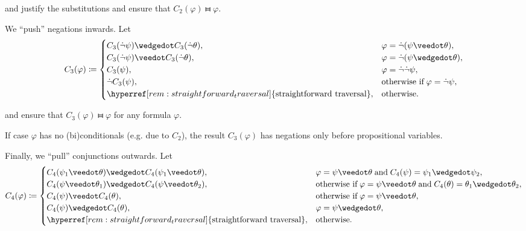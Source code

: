 \begin{algorithm}
\begin{thmenum}
     and  justify the substitutions and ensure that \( C_2(\varphi) \gleichstark \varphi \).

     We \enquote{push} negations inwards. Let
    \begin{equation*}
      C_3(\varphi) \coloneqq \begin{cases}
        C_3(\synneg \psi) \synwedge C_3(\synneg \theta),                         &\varphi = \synneg (\psi \synvee \theta), \\
        C_3(\synneg \psi) \synvee C_3(\synneg \theta),                           &\varphi = \synneg (\psi \synwedge \theta), \\
        C_3(\psi),                                                               &\varphi = \synneg \synneg \psi, \\
        \synneg C_3(\psi),                                                       &\T{otherwise if} \varphi = \synneg \psi, \\
        \hyperref[rem:straightforward_traversal]{\T{straightforward traversal}}, &\T{otherwise.}
      \end{cases}
    \end{equation*}

     and  ensure that \( C_3(\varphi) \gleichstark \varphi \) for any formula \( \varphi \).

    If case \( \varphi \) has no (bi)conditionals (e.g. due to \( C_2 \)), the result \( C_3(\varphi) \) has negations only before propositional variables.

     Finally, we \enquote{pull} conjunctions outwards. Let
    \begin{equation*}
      C_4(\varphi) \coloneqq \begin{cases}
        C_4(\psi_1 \synvee \theta) \synwedge C_4(\psi_1 \synvee \theta),         &\varphi = \psi \synvee \theta \T{and} C_4(\psi) = \psi_1 \synwedge \psi_2, \\
        C_4(\psi \synvee \theta_1) \synwedge C_4(\psi \synvee \theta_2),         &\T{otherwise if} \varphi = \psi \synvee \theta \T{and} C_4(\theta) = \theta_1 \synwedge \theta_2, \\
        C_4(\psi) \synvee C_4(\theta),                                           &\T{otherwise if} \varphi = \psi \synvee \theta, \\
        C_4(\psi) \synwedge C_4(\theta),                                         &\varphi = \psi \synwedge \theta, \\
        \hyperref[rem:straightforward_traversal]{\T{straightforward traversal}}, &\T{otherwise.}
      \end{cases}
    \end{equation*}


\end{thmenum}
\end{algorithm}
